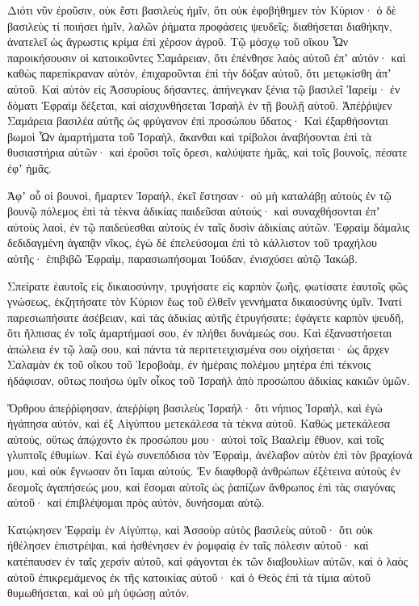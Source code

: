 \begin{spacing}{1.1}
\begin{multicols}{2}
Διότι νῦν ἐροῦσιν, οὐκ ἔστι βασιλεὺς ἡμῖν, ὅτι οὐκ ἐφοβήθημεν τὸν Κύριον· ὁ δὲ βασιλεὺς τί ποιήσει ἡμῖν,
λαλῶν ῥήματα προφάσεις ψευδεῖς; διαθήσεται διαθήκην, ἀνατελεῖ ὡς ἄγρωστις κρίμα ἐπὶ χέρσον ἀγροῦ.
Τῷ μόσχῳ τοῦ οἴκου Ὦν παροικήσουσιν οἱ κατοικοῦντες Σαμάρειαν, ὅτι ἐπένθησε λαὸς αὐτοῦ ἐπʼ αὐτόν· καὶ καθὼς παρεπίκραναν αὐτὸν, ἐπιχαροῦνται ἐπὶ τὴν δόξαν αὐτοῦ, ὅτι μετῳκίσθη ἀπʼ αὐτοῦ.
Καὶ αὐτὸν εἰς Ἀσσυρίους δήσαντες, ἀπήνεγκαν ξένια τῷ βασιλεῖ Ἰαρείμ· ἐν δόματι Ἐφραὶμ δέξεται, καὶ αἰσχυνθήσεται Ἰσραὴλ ἐν τῇ βουλῇ αὐτοῦ.
Ἀπέῤῥιψεν Σαμάρεια βασιλέα αὐτῆς ὡς φρύγανον ἐπὶ προσώπου ὕδατος·
Καὶ ἐξαρθήσονται βωμοὶ Ὦν ἁμαρτήματα τοῦ Ἰσραὴλ, ἄκανθαι καὶ τρίβολοι ἀναβήσονται ἐπὶ τὰ θυσιαστήρια αὐτῶν· καὶ ἐροῦσι τοῖς ὄρεσι, καλύψατε ἡμᾶς, καὶ τοῖς βουνοῖς, πέσατε ἐφʼ ἡμᾶς.

Ἀφʼ οὗ οἱ βουνοὶ, ἥμαρτεν Ἰσραήλ, ἐκεῖ ἔστησαν· οὐ μὴ καταλάβῃ αὐτοὺς ἐν τῷ βουνῷ πόλεμος ἐπὶ τὰ τὲκνα ἀδικίας
παιδεῦσαι αὐτούς· καὶ συναχθήσονται ἐπʼ αὐτοὺς λαοὶ, ἐν τῷ παιδεύεσθαι αὐτοὺς ἐν ταῖς δυσὶν ἀδικίαις αὐτῶν.
Ἐφραὶμ δάμαλις δεδιδαγμένη ἀγαπᾷν νῖκος, ἐγὼ δὲ ἐπελεύσομαι ἐπὶ τὸ κάλλιστον τοῦ τραχήλου αὐτῆς· ἐπιβιβῶ Ἐφραὶμ, παρασιωπήσομαι Ἰούδαν, ἐνισχύσει αὐτῷ Ἰακώβ.

Σπείρατε ἑαυτοῖς εἰς δικαιοσύνην, τρυγήσατε εἰς καρπὸν ζωῆς, φωτίσατε ἑαυτοῖς φῶς γνώσεως, ἐκζητήσατε τὸν Κύριον ἕως τοῦ ἐλθεῖν γεννήματα δικαιοσύνης ὑμῖν.
Ἱνατί παρεσιωπήσατε ἀσέβειαν, καὶ τὰς ἀδικίας αὐτῆς ἐτρυγήσατε; ἐφάγετε καρπὸν ψευδῆ, ὅτι ἤλπισας ἐν τοῖς ἁμαρτήμασί σου, ἐν πλήθει δυνάμεώς σου.
Καὶ ἐξαναστήσεται ἀπώλεια ἐν τῷ λαῷ σου, καὶ πάντα τὰ περιτετειχισμένα σου οἰχήσεται· ὡς ἄρχεν Σαλαμὰν ἐκ τοῦ οἴκου τοῦ Ἱεροβοὰμ, ἐν ἡμέραις πολέμου μητέρα ἐπὶ τέκνοις ἠδάφισαν,
οὕτως ποιήσω ὑμῖν οἶκος τοῦ Ἰσραὴλ ἀπὸ προσώπου ἀδικίας κακιῶν ὑμῶν.

Ὄρθρου ἀπεῤῥίφησαν, ἀπεῤῥίφη βασιλεὺς Ἰσραήλ· ὅτι νήπιος Ἰσραὴλ, καὶ ἐγὼ ἠγάπησα αὐτόν, καὶ ἐξ Αἰγύπτου μετεκάλεσα τὰ τέκνα αὐτοῦ.
Καθὼς μετεκάλεσα αὐτούς, οὕτως ἀπῴχοντο ἐκ προσώπου μου· αὐτοὶ τοῖς Βααλεὶμ ἔθυον, καὶ τοῖς γλυπτοῖς ἐθυμίων.
Καὶ ἐγὼ συνεπόδισα τὸν Ἐφραὶμ, ἀνέλαβον αὐτὸν ἐπὶ τὸν βραχίονά μου, καὶ οὐκ ἔγνωσαν ὅτι ἴαμαι αὐτούς.
Ἐν διαφθορᾷ ἀνθρώπων ἐξέτεινα αὐτοὺς ἐν δεσμοῖς ἀγαπήσεώς μου, καὶ ἔσομαι αὐτοῖς ὡς ῥαπίζων ἄνθρωπος ἐπὶ τὰς σιαγόνας αὐτοῦ· καὶ ἐπιβλέψομαι πρὸς αὐτόν, δυνήσομαι αὐτῷ.

Κατῴκησεν Ἐφραὶμ ἐν Αἰγύπτῳ, καὶ Ἀσσοὺρ αὐτὸς βασιλεὺς αὐτοῦ· ὅτι οὐκ ἠθέλησεν ἐπιστρέψαι,
καὶ ἠσθένησεν ἐν ῥομφαίᾳ ἐν ταῖς πόλεσιν αὐτοῦ· καὶ κατέπαυσεν ἐν ταῖς χερσὶν αὐτοῦ, καὶ φάγονται ἐκ τῶν διαβουλίων αὐτῶν,
καὶ ὁ λαὸς αὐτοῦ ἐπικρεμάμενος ἐκ τῆς κατοικίας αὐτοῦ· καὶ ὁ Θεὸς ἐπὶ τὰ τίμια αὐτοῦ θυμωθήσεται, καὶ οὐ μὴ ὑψώσῃ αὐτόν.


\end{multicols}
\end{spacing}
